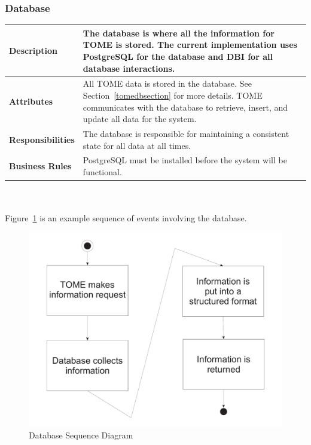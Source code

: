 \documentclass[12pt,titlepage]{article}
\begin{document}
\subsubsection{Database}
\begin{tabular}{|p{}|p{}|}
	\hline
	\textbf{Description} & The database is where all the information for TOME is stored.  The current implementation uses PostgreSQL for the database and DBI for all database interactions. \\
	\hline
	\textbf{Attributes} & All TOME data is stored in the database.  See Section~\ref{tomedbsection} for more details. TOME communicates with the database to retrieve, insert, and update all data for the system.\\
	\hline
	\textbf{Responsibilities} & The database is responsible for maintaining a consistent state for all data at all times. \\
	\hline
	\textbf{Business Rules} & PostgreSQL must be installed before the system will be functional. \\
	\hline
\end{tabular}
\\
\\
Figure~\ref{DatabaseSequenceDiagram} is an example sequence of events involving the database.
\begin{figure}[h]
	\centering
	\includegraphics[width=.5\textwidth]{DatabaseSequenceDiagram}
	\caption{Database Sequence Diagram}
	\label{DatabaseSequenceDiagram}
\end{figure}
\end{document}
